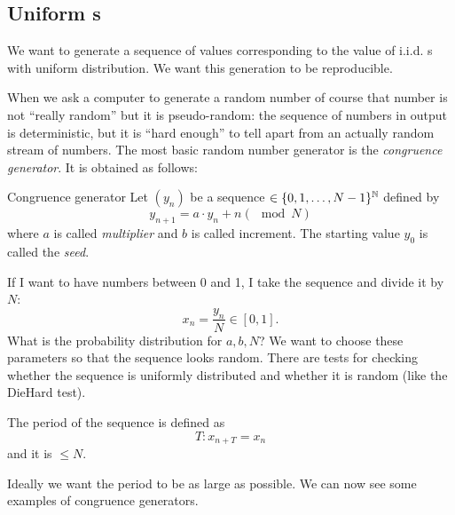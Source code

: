 \documentclass[12pt]{report}
\begin{document}
\subsection{Uniform \rv s}
We want to generate a sequence of values corresponding to the value of i.i.d. \rv s with uniform distribution. We want this generation to be reproducible.\par
When we ask a computer to generate a random number of course that number is not ``really random'' but it is pseudo-random: the sequence of numbers in output is deterministic, but it is ``hard enough'' to tell apart from an actually random stream of numbers. The most basic random number generator is the \emph{congruence generator}. It is obtained as follows:
\begin{algobox}{Congruence generator}
	Let $(y_{n})$ be a sequence $\in\{0,1,\ldots,N-1\}^{\mathbb{N}}$ defined by
	\begin{equation*}
		y_{n+1}=a\cdot y_{n}+n(\mod N)
	\end{equation*}
	where $a$ is called \emph{multiplier} and $b$ is called increment. The starting value $y_{0}$ is called the \emph{seed}.
\end{algobox}
If I want to have numbers between 0 and 1, I take the sequence and divide it by $N$:
\begin{equation*}
	x_{n}=\frac{y_{n}}{N}\in[0,1].
\end{equation*}
What is the probability distribution for $a,b,N$? We want to choose these parameters so that the sequence looks random. There are tests for checking whether the sequence is uniformly distributed and whether it is random (like the DieHard test).\par
\begin{definition}
	The period of the sequence is defined as
	\begin{equation*}
		T:x_{n+T}=x_{n}
	\end{equation*}
	and it is $\leq N$.
\end{definition}
Ideally we want the period to be as large as possible. We can now see some examples of congruence generators.
\end{document}
